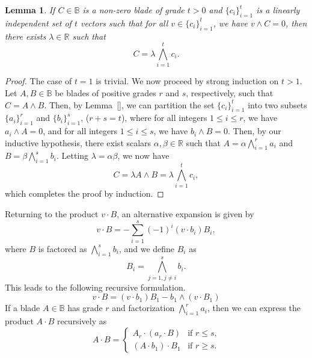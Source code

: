 \documentclass{birkjour}
\newtheorem{lem}[thm]{Lemma}
\theoremstyle{definition}
\theoremstyle{remark}
\numberwithin{equation}{section}
\newcommand{\R}{\mathbb{R}}
\newcommand{\B}{\mathbb{B}}
\begin{document}
\begin{lem}
If $C\in\B$ is a non-zero blade of grade $t>0$ and $\{c_i\}_{i=1}^t$ is a linearly
independent set of $t$ vectors such that for all $v\in\{c_i\}_{i=1}^t$, we have
$v\wedge C=0$, then there exists $\lambda\in\R$ such that
\begin{equation*}
C = \lambda\bigwedge_{i=1}^t c_i.
\end{equation*}
\end{lem}
\begin{proof}
The case of $t=1$ is trivial.  We now proceed by strong induction on $t>1$.
Let $A,B\in\B$ be blades of positive grades $r$ and $s$, respectively, such
that $C=A\wedge B$.  Then, by Lemma~\ref{}, we can partition the set $\{c_i\}_{i=1}^t$
into two subsets $\{a_i\}_{i=1}^r$ and $\{b_i\}_{i=1}^s$, ($r+s=t$), where for all
integers $1\leq i\leq r$, we have $a_i\wedge A=0$, and for all integers $1\leq i\leq s$,
we have $b_i\wedge B=0$.  Then, by our inductive hypothesis, there exist scalars $\alpha,\beta\in\R$
such that $A=\alpha\bigwedge_{i=1}^r a_i$ and $B=\beta\bigwedge_{i=1}^s b_i$.
Letting $\lambda=\alpha\beta$, we now have
\begin{equation*}
C = \lambda A\wedge B=\lambda\bigwedge_{i=1}^t c_i,
\end{equation*}
which completes the proof by induction.
\end{proof}

Returning to the product $v\cdot B$, an alternative expansion is given by
\begin{equation}\label{equ_v_dot_B_sum}
v\cdot B = -\sum_{i=1}^s (-1)^i(v\cdot b_i)B_i,
\end{equation}
where $B$ is factored as $\bigwedge_{i=1}^s b_i$, and we define $B_i$ as
\begin{equation*}
B_i = \bigwedge_{j=1,j\neq i}^s b_i.
\end{equation*}
This leads to the following recursive formulation.
\begin{equation*}
v\cdot B=(v\cdot b_1)B_1-b_1\wedge(v\cdot B_1)
\end{equation*}
If a blade $A\in\B$ has grade $r$ and factorization $\bigwedge_{i=1}^r a_i$, then
we can express the product $A\cdot B$ recursively as
\begin{equation*}
A\cdot B = \left\{\begin{array}{ll}
A_r\cdot (a_r\cdot B) & \mbox{if $r\leq s$,} \\
(A\cdot b_1)\cdot B_1 & \mbox{if $r\geq s$.}
\end{array}\right.
\end{equation*}
\end{document}
